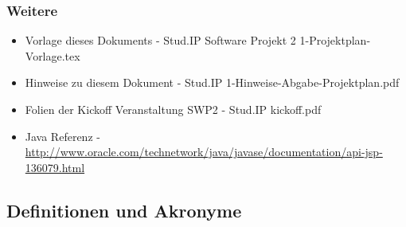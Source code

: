 \documentclass[fontsize=12pt,paper=a4,twoside]{scrartcl}
\begin{document}
\subsubsection{Weitere}
\begin{itemize}
\item{Vorlage dieses Dokuments - Stud.IP Software Projekt 2 1-Projektplan-Vorlage.tex}
\item{Hinweise zu diesem Dokument - Stud.IP 1-Hinweise-Abgabe-Projektplan.pdf}
\item{Folien der Kickoff Veranstaltung SWP2 - Stud.IP kickoff.pdf}
\item{Java Referenz - \url{http://www.oracle.com/technetwork/java/javase/documentation/api-jsp-136079.html}}
\end{itemize}

%
%
%
%

{\renewcommand\section[2]{}

}

\newpage

\subsection{Definitionen und Akronyme\\}
\end{document}
